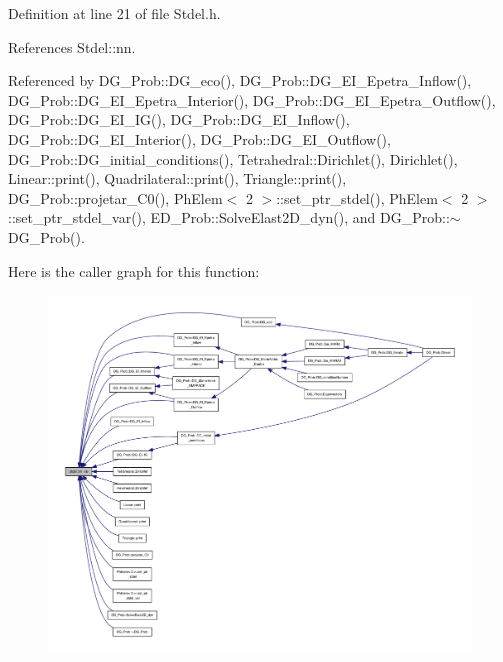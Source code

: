 Definition at line 21 of file Stdel.\+h.



References Stdel\+::nn.



Referenced by D\+G\+\_\+\+Prob\+::\+D\+G\+\_\+eco(), D\+G\+\_\+\+Prob\+::\+D\+G\+\_\+\+E\+I\+\_\+\+Epetra\+\_\+\+Inflow(), D\+G\+\_\+\+Prob\+::\+D\+G\+\_\+\+E\+I\+\_\+\+Epetra\+\_\+\+Interior(), D\+G\+\_\+\+Prob\+::\+D\+G\+\_\+\+E\+I\+\_\+\+Epetra\+\_\+\+Outflow(), D\+G\+\_\+\+Prob\+::\+D\+G\+\_\+\+E\+I\+\_\+\+I\+G(), D\+G\+\_\+\+Prob\+::\+D\+G\+\_\+\+E\+I\+\_\+\+Inflow(), D\+G\+\_\+\+Prob\+::\+D\+G\+\_\+\+E\+I\+\_\+\+Interior(), D\+G\+\_\+\+Prob\+::\+D\+G\+\_\+\+E\+I\+\_\+\+Outflow(), D\+G\+\_\+\+Prob\+::\+D\+G\+\_\+initial\+\_\+conditions(), Tetrahedral\+::\+Dirichlet(), Dirichlet(), Linear\+::print(), Quadrilateral\+::print(), Triangle\+::print(), D\+G\+\_\+\+Prob\+::projetar\+\_\+\+C0(), Ph\+Elem$<$ 2 $>$\+::set\+\_\+ptr\+\_\+stdel(), Ph\+Elem$<$ 2 $>$\+::set\+\_\+ptr\+\_\+stdel\+\_\+var(), E\+D\+\_\+\+Prob\+::\+Solve\+Elast2\+D\+\_\+dyn(), and D\+G\+\_\+\+Prob\+::$\sim$\+D\+G\+\_\+\+Prob().

Here is the caller graph for this function\+:
\nopagebreak
\begin{figure}[H]
\begin{center}
\leavevmode
\includegraphics[width=350pt]{classStdel_a6086dceed8fe3dd410da0d6b84f02377_icgraph}
\end{center}
\end{figure}
\mbox{\label{classStdel_ae2ab461d1bc8d9f6006665fe03684845}} 
